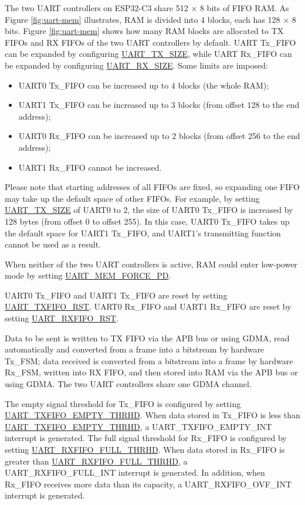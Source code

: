 \documentclass[main\_\_EN.tex]{subfiles}
\begin{document}
The two UART controllers on ESP32-C3 share 512 × 8 bits of FIFO RAM. As Figure \ref{fig:uart-mem} illustrates, RAM is divided into 4 blocks, each has 128 × 8 bits. Figure \ref{fig:uart-mem} shows how many RAM blocks are allocated to TX FIFOs and RX FIFOs of the two UART controllers by default. UART Tx\_FIFO can be expanded by configuring \hyperref[fielddesc:UARTTXSIZE]{UART\_TX\_SIZE}, while UART Rx\_FIFO can be expanded by configuring \hyperref[fielddesc:UARTRXSIZE]{UART\_RX\_SIZE}. 
Some limits are imposed:
\begin{itemize}
    \item UART0 Tx\_FIFO can be increased up to 4 blocks (the whole RAM);
    \item UART1 Tx\_FIFO can be increased up to 3 blocks (from offset 128 to the end address);
    \item UART0 Rx\_FIFO can be increased up to 2 blocks (from offset 256 to the end address);
    \item UART1 Rx\_FIFO cannot be increased.
\end{itemize}

Please note that starting addresses of all FIFOs are fixed, so expanding one FIFO may take up the default space of other FIFOs. For example, by setting \hyperref[fielddesc:UARTTXSIZE]{UART\_TX\_SIZE} of UART0 to 2, the size of UART0 Tx\_FIFO is increased by 128 bytes (from offset 0 to offset 255). In this case, UART0 Tx\_FIFO takes up the default space for UART1 Tx\_FIFO, and UART1's transmitting function cannot be used as a result.

When neither of the two UART controllers is active, RAM could enter low-power mode by setting \hyperref[fielddesc:UARTMEMFORCEPD]{UART\_MEM\_FORCE\_PD}.

UART0 Tx\_FIFO and UART1 Tx\_FIFO are reset by setting \hyperref[fielddesc:UARTTXFIFORST]{UART\_TXFIFO\_RST}. UART0 Rx\_FIFO and UART1 Rx\_FIFO are reset by setting \hyperref[fielddesc:UARTRXFIFORST]{UART\_RXFIFO\_RST}.

Data to be sent is written to TX FIFO via the APB bus or using GDMA, read automatically and converted from a frame into a bitstream by hardware Tx\_FSM; data received is converted from a bitstream into a frame by hardware Rx\_FSM, written into RX FIFO, and then stored into RAM via the APB bus or using GDMA. The two UART controllers share one GDMA channel.

The empty signal threshold for Tx\_FIFO is configured by setting \hyperref[fielddesc:UARTTXFIFOEMPTYTHRHD]{UART\_TXFIFO\_EMPTY\_THRHD}. When data stored in Tx\_FIFO is less than \hyperref[fielddesc:UARTTXFIFOEMPTYTHRHD]{UART\_TXFIFO\_EMPTY\_THRHD}, a UART\_TXFIFO\_EMPTY\_INT interrupt is generated. The full signal threshold for Rx\_FIFO is configured by setting \hyperref[fielddesc:UARTRXFIFOFULLTHRHD]{UART\_RXFIFO\_FULL\_THRHD}. When data stored in Rx\_FIFO is greater than \hyperref[fielddesc:UARTRXFIFOFULLTHRHD]{UART\_RXFIFO\_FULL\_THRHD}, a UART\_RXFIFO\_FULL\_INT interrupt is generated. In addition, when Rx\_FIFO receives more data than its capacity, a UART\_RXFIFO\_OVF\_INT interrupt is generated.
\end{document}
